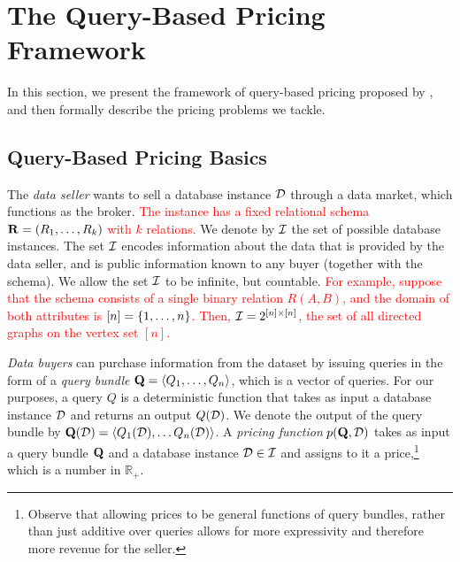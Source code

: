 \section{The Query-Based Pricing Framework}
\label{sec:framework}

In this section, we present the framework of query-based pricing proposed by \cite{deep2016design} , and then formally describe the pricing problems we tackle.

\subsection{Query-Based Pricing Basics}

The {\em data seller} wants to sell a database instance $\mathcal{D}$ through a data market, which functions as the broker. \textcolor{red}{The instance has a fixed relational schema $\mathbf{R} = (R_1, \dots, R_k)$ with $k$ relations.} We denote by $\mathcal{I}$ the set of possible database instances. The set $\mathcal{I}$ encodes information about the data that is provided by the data seller, and is public information known to any buyer (together with the schema). We allow the set $\mathcal{I}$ to be infinite, but countable. \textcolor{red}{For example, suppose that the schema consists of a single binary relation $R(A,B)$, and the domain of both attributes is $[n] = \{1, \dots, n\}$. Then, $\mathcal{I} = 2^{[n] \times [n]}$, \ie the set of all directed graphs on the vertex set $[n]$.}

{\em Data buyers} can purchase information from the dataset by issuing queries in the form of a {\em query bundle}  $\mathbf{Q}=\langle {Q_1, \hdots, Q_n} \rangle$, which is a vector of queries. For our purposes, a query $Q$ is a deterministic function that takes as input a database instance $\mathcal{D}$ and returns an output $Q(\mathcal{D})$. We denote the output of the query bundle by $\mathbf{Q}(\mathcal{D}) = \langle {Q_1(\mathcal{D}), \hdots Q_n(\mathcal{D})} \rangle$. 
A {\em pricing function} $p(\mathbf{Q}, \mathcal{D})$ takes as input a query bundle $\mathbf{Q}$ and a database instance $\mathcal{D} \in \mathcal{I}$ and assigns to it a price,\footnote{Observe that allowing prices to be general functions of query bundles, rather than just additive over queries allows for more expressivity and therefore more revenue for the seller.} which is a number in $ \mathbb{R}_+$. 

